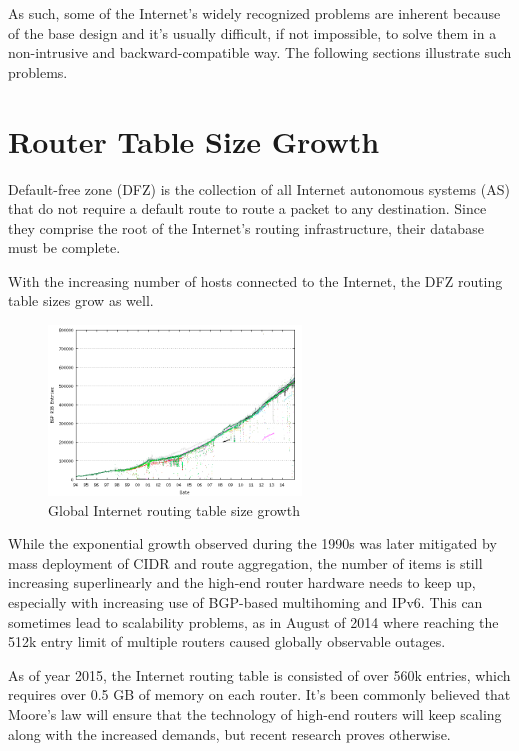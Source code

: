     As such, some of the Internet's widely recognized problems are inherent because of the base design and it's usually difficult, if not impossible, to solve them in a non-intrusive and backward-compatible way. The following sections illustrate such problems.

    \section{Router Table Size Growth}
        Default-free zone (DFZ) is the collection of all Internet autonomous systems (AS) that do not require a default route to route a packet to any destination. Since they comprise the root of the Internet's routing infrastructure, their database must be complete.

        With the increasing number of hosts connected to the Internet, the DFZ routing table sizes grow as well.

        \begin{figure}[H]
            \begin{center}
                \includegraphics[width=0.6\textwidth]{fig/bgp-active.png}
              \caption{Global Internet routing table size growth}
              \label{bgp-growth}
            \end{center}
        \end{figure}


        While the exponential growth observed during the 1990s was later mitigated by mass deployment of CIDR and route aggregation, the number of items is still increasing superlinearly and the high-end router hardware needs to keep up, especially with increasing use of BGP-based multihoming and IPv6. This can sometimes lead to scalability problems, as in August of 2014 where reaching the 512k entry limit of multiple routers caused globally observable outages.

        As of year 2015, the Internet routing table is consisted of over 560k entries, which requires over 0.5 GB of memory on each router. It's been commonly believed that Moore's law will ensure that the technology of high-end routers will keep scaling along with the increased demands, but recent research proves otherwise.

